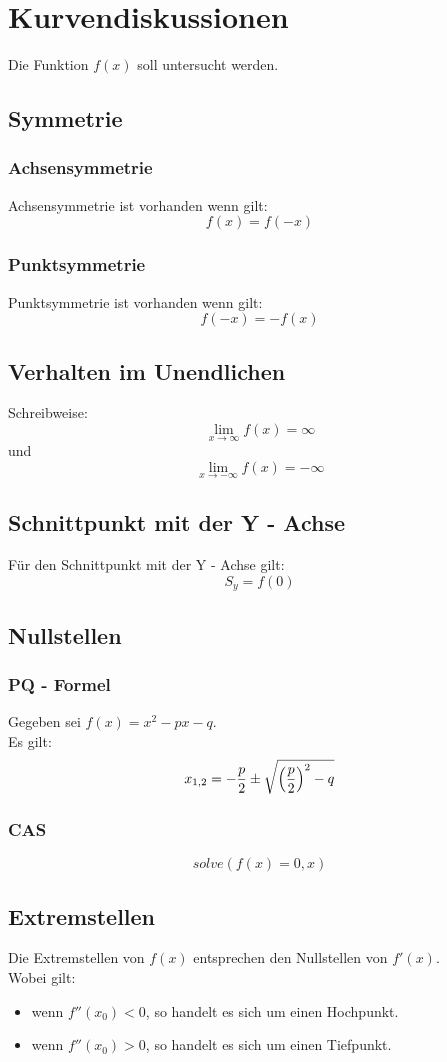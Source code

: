 \documentclass[a4paper,12pt]{article}
\begin{document}
\section{Kurvendiskussionen}
Die Funktion $f(x)$ soll untersucht werden.
\subsection{Symmetrie}
\subsubsection{Achsensymmetrie}
Achsensymmetrie ist vorhanden wenn gilt:
$$f(x) = f(-x)$$
\subsubsection{Punktsymmetrie}
Punktsymmetrie ist vorhanden wenn gilt:
$$f(-x) = -f(x)$$
\subsection{Verhalten im Unendlichen}
Schreibweise:
\[\lim_{x \to \infty} f(x) = \infty\]
und
\[\lim_{x \to -\infty} f(x) = -\infty\]
\subsection{Schnittpunkt mit der Y - Achse}
Für den Schnittpunkt mit der Y - Achse gilt:
$$S_y = f(0)$$
\subsection{Nullstellen}
\subsubsection{PQ - Formel}
Gegeben sei $f(x) = x^2 - px - q$.\\
Es gilt:
$$x_{1,2} = - \frac{p}{2} \pm \sqrt{\Big{(}\frac{p}{2}\Big{)}^2 - q}$$
\subsubsection{CAS}
$$solve(f(x) = 0, x)$$
\subsection{Extremstellen}
Die Extremstellen von $f(x)$ entsprechen den Nullstellen von $f'(x)$.\\
Wobei gilt:
\begin{itemize}
\item wenn $f''(x_0) < 0$, so handelt es sich um einen Hochpunkt.
\item wenn $f''(x_0) > 0$, so handelt es sich um einen Tiefpunkt.
\end{itemize}
\end{document}
